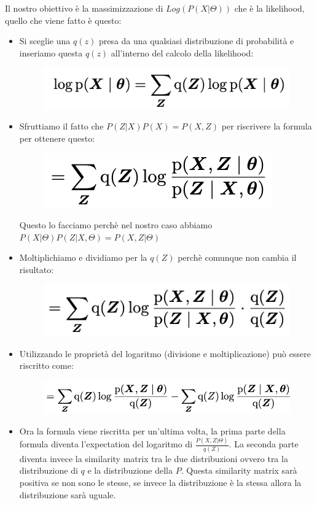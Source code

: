\documentclass[14pt]{extreport}
\begin{document}
Il nostro obiettivo è la massimizzazione di $Log(P(X|\Theta))$ che è la likelihood, quello che viene fatto è questo:
\begin{itemize}
\item Si sceglie una $q(z)$ presa da una qualsiasi distribuzione di probabilità e inseriamo questa $q(z)$ all'interno del calcolo della likelihood:
\begin{figure}[H] 
\centering
\includegraphics[width=0.7\linewidth]{558.jpeg}
\end{figure}
\item Sfruttiamo il fatto che $P(Z|X)P(X) = P(X,Z)$ per riscrivere la formula per ottenere questo:
\begin{figure}[H] 
\centering
\includegraphics[width=0.7\linewidth]{559.jpeg}
\end{figure}
Questo lo facciamo perchè nel nostro caso abbiamo $P(X|\Theta)P(Z|X,\Theta) = P(X,Z|\Theta)$
\item Moltiplichiamo e dividiamo per la $q(Z)$ perchè comunque non cambia il risultato:
\begin{figure}[H] 
\centering
\includegraphics[width=0.7\linewidth]{560.jpeg}
\end{figure}
\item Utilizzando le proprietà del logaritmo (divisione e moltiplicazione) può essere riscritto come:

\begin{figure}[H] 
\centering
\includegraphics[width=0.7\linewidth]{561.jpeg}
\end{figure}

\item Ora la formula viene riscritta per un'ultima volta, la prima parte della formula diventa l'expectation del logaritmo di $\frac{P(X,Z|\Theta)}{q(Z)}$. 
La seconda parte diventa invece la similarity matrix tra le due distribuzioni ovvero tra la distribuzione di $q$ e la distribuzione della $P$.
Questa similarity matrix sarà positiva se non sono le stesse, se invece la distribuzione è la stessa allora la distribuzione sarà uguale.


\end{itemize}
\end{document}
